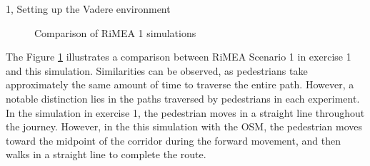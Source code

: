 \begin{task}{1, Setting up the Vadere environment}
\begin{figure}[H]
\caption{Comparison of RiMEA 1 simulations}
\label{rimea1}
\end{figure}

\newpage
The Figure \ref{rimea1} illustrates a comparison between RiMEA Scenario 1 in exercise 1 and this simulation. Similarities can be observed, as pedestrians take approximately the same amount of time to traverse the entire path. However, a notable distinction lies in the paths traversed by pedestrians in each experiment. In the simulation in exercise 1, the pedestrian moves in a straight line throughout the journey. However, in the this simulation with the OSM, the pedestrian moves toward the midpoint of the corridor during the forward movement, and then walks in a straight line to complete the route.


\end{task}
